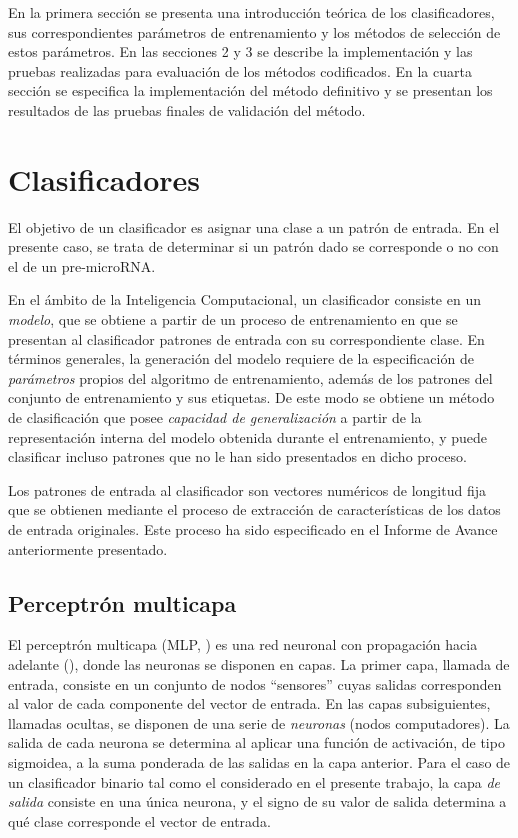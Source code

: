 \documentclass[12pt,bibliography=oldstyle,DIV=12,parskip=half-]{scrreprt}
\begin{document}
En la primera sección se presenta una introducción teórica de los
clasificadores, sus correspondientes parámetros de entrenamiento y los
métodos de selección de estos parámetros. En las secciones 2 y 3 se
describe la implementación y las pruebas realizadas para evaluación de
los métodos codificados. En la cuarta sección se especifica la
implementación del método definitivo y se presentan los resultados de
las pruebas finales de validación del método.
%
%
\section{Clasificadores}
%
El objetivo de un clasificador es asignar una clase a un patrón de
entrada. En el presente caso, se trata de determinar si un patrón dado
se corresponde o no con el de un pre-microRNA.

En el ámbito de la Inteligencia Computacional, un clasificador
consiste en un \emph{modelo}, que se obtiene a partir de un proceso de
entrenamiento en que se presentan al clasificador patrones de entrada
con su correspondiente clase. En términos generales, la generación del
modelo requiere de la especificación de \emph{parámetros} propios del
algoritmo de entrenamiento, además de los patrones del conjunto de
entrenamiento y sus etiquetas. De este modo se obtiene un método de
clasificación que posee \emph{capacidad de generalización} a partir de
la representación interna del modelo obtenida durante el
entrenamiento, y puede clasificar incluso patrones que no le han sido
presentados en dicho proceso.

Los patrones de entrada al clasificador son vectores numéricos de
longitud fija que se obtienen mediante el proceso de extracción de
características de los datos de entrada originales. Este proceso ha
sido especificado en el Informe de Avance anteriormente presentado.
%
%
\subsection{Perceptrón multicapa}
%
El perceptrón multicapa (MLP, )
\cite{mlp1,mlp2} es una red neuronal con propagación hacia adelante
(), donde las neuronas se disponen en capas. La
primer capa, llamada de entrada, consiste en un conjunto de nodos
``sensores'' cuyas salidas corresponden al valor de cada componente
del vector de entrada. En las capas subsiguientes, llamadas
{ocultas}, se disponen de una serie de \emph{neuronas} (nodos
computadores).  La salida de cada neurona se determina al aplicar una
función de activación, de tipo sigmoidea, a la suma ponderada de las
salidas en la capa anterior.  Para el caso de un clasificador binario
tal como el considerado en el presente trabajo, la capa \emph{de
  salida} consiste en una única neurona, y el signo de su valor de
salida determina a qué clase corresponde el vector de entrada.
\end{document}
